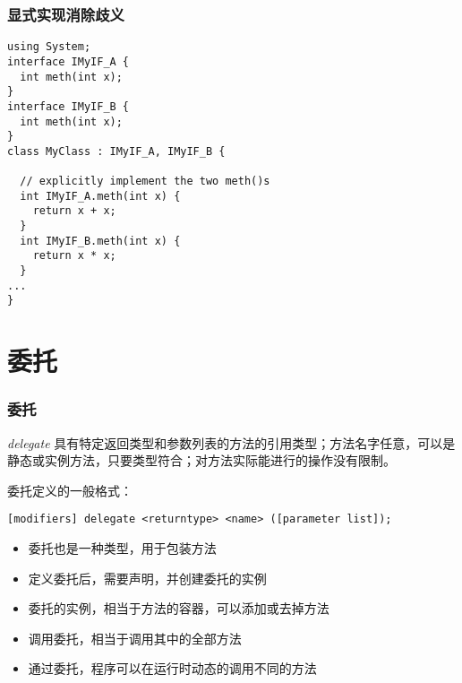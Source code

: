 \begin{frame}[fragile]
\frametitle{显式实现消除歧义}
\begin{lstlisting}
using System;
interface IMyIF_A {
  int meth(int x);
}
interface IMyIF_B {
  int meth(int x);
}
class MyClass : IMyIF_A, IMyIF_B {

  // explicitly implement the two meth()s
  int IMyIF_A.meth(int x) {
    return x + x;
  }
  int IMyIF_B.meth(int x) {
    return x * x;
  }
...
}
\end{lstlisting}


\end{frame}

\section{委托}

\begin{frame}[fragile]
\frametitle{委托}
  \begin{block}{\textit{delegate}}
    \CJKindent 具有特定返回类型和参数列表的方法的引用类型；方法名字任意，可以是
    静态或实例方法，只要类型符合；对方法实际能进行的操作没有限制。
  \end{block}
委托定义的一般格式：
\begin{lstlisting}
[modifiers] delegate <returntype> <name> ([parameter list]);
\end{lstlisting} \pause

  \begin{itemize}
  \item 委托也是一种类型，用于包装方法
  \item 定义委托后，需要声明，并创建委托的实例
  \item 委托的实例，相当于方法的容器，可以添加或去掉方法
  \item 调用委托，相当于调用其中的全部方法
  \item 通过委托，程序可以在运行时动态的调用不同的方法
  \end{itemize}
\end{frame}


